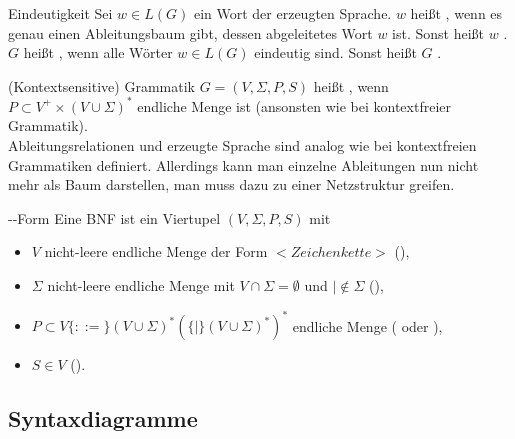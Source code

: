 \begin{Def}{Eindeutigkeit}
    Sei $w \in L(G)$ ein Wort der erzeugten Sprache.
    $w$ heißt , wenn es genau einen Ableitungsbaum gibt,
    dessen abgeleitetes Wort $w$ ist.
    Sonst heißt $w$ . \\
    $G$ heißt , wenn alle Wörter $w \in L(G)$ eindeutig
    sind.
    Sonst heißt $G$ .
\end{Def}

\begin{Def}{(Kontextsensitive) Grammatik}
    $G = (V, \Sigma, P, S)$ heißt , wenn \\
    $P \subset V^+ \times (V \cup \Sigma)^\ast$ endliche Menge ist
    (ansonsten wie bei kontextfreier Grammatik). \\
    Ableitungsrelationen und erzeugte Sprache sind analog wie bei
    kontextfreien Grammatiken definiert.
    Allerdings kann man einzelne Ableitungen nun nicht mehr als Baum
    darstellen, man muss dazu zu einer Netzstruktur greifen.
\end{Def}

\begin{Def}{--Form}
    Eine BNF ist ein Viertupel $(V, \Sigma, P, S)$ mit
    \begin{itemize}
        \item $V$ nicht-leere endliche Menge der Form
        $<\!\!Zeichenkette\!\!>$ (),
        
        \item $\Sigma$ nicht-leere endliche Menge mit
        $V \cap \Sigma = \emptyset$ und $| \notin \Sigma$
        (),
        
        \item $P \subset V \{::=\}
        (V \cup \Sigma)^\ast (\{|\} (V \cup \Sigma)^\ast)^\ast$
        endliche Menge ( oder ),
        
        \item $S \in V$ ().
    \end{itemize}
\end{Def}

\subsection{%
    Syntaxdiagramme%
}

